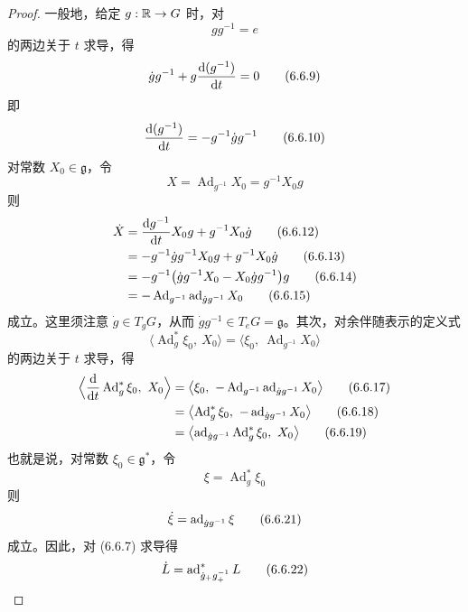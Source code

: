 \begin{proof}
  一般地，给定 $g:\mathbb{R}\to G$ 时，对
  \begin{equation}
    gg^{-1} = e
    \tag{6.6.8}
  \end{equation}
  的两边关于 $t$ 求导，得
  \begin{equation}
    \dot{g}g^{-1} + g\frac{\mathrm{d}(g^{-1})}{\mathrm{d} t} = 0
    \tag{6.6.9}
  \end{equation}
  即
  \begin{equation}
    \frac{\mathrm{d}(g^{-1})}{\mathrm{d} t} = -g^{-1}\dot{g}g^{-1}
    \tag{6.6.10}
  \end{equation}
  对常数 $X_0\in\mathfrak{g}$，令
  \begin{equation}
    X = \operatorname{Ad}_{g^{-1}}X_0 = g^{-1}X_0g
    \tag{6.6.11}
  \end{equation}
  则
  \begin{align}
    \dot{X} &= \frac{\mathrm{d} g^{-1}}{\mathrm{d} t}X_0g + g^{-1}X_0\dot{g} \tag{6.6.12}\\
    &= -g^{-1}\dot{g}g^{-1}X_0g + g^{-1}X_0\dot{g} \tag{6.6.13}\\
    &= -g^{-1}\bigl(\dot{g}g^{-1}X_0 - X_0\dot{g}g^{-1}\bigr)g \tag{6.6.14}\\
    &= -\operatorname{Ad}_{g^{-1}}\operatorname{ad}_{\dot{g}g^{-1}}X_0 \tag{6.6.15}
  \end{align}
  成立。这里须注意 $\dot{g}\in T_gG$，从而 $\dot{g}g^{-1}\in T_eG=\mathfrak{g}$。其次，对余伴随表示的定义式
  \begin{equation}
    \bigl\langle \operatorname{Ad}^*_g\xi_0,\ X_0\bigr\rangle
    = \bigl\langle \xi_0,\ \operatorname{Ad}_{g^{-1}}X_0\bigr\rangle
    \tag{6.6.16}
  \end{equation}
  的两边关于 $t$ 求导，得
  \begin{align}
    \Bigl\langle \frac{\rd}{\rd t}\operatorname{Ad}^*_g\xi_0,\ X_0\Bigr\rangle
      &= \bigl\langle \xi_0,\ -\operatorname{Ad}_{g^{-1}}\ad_{\dot{g}g^{-1}}X_0\bigr\rangle \tag{6.6.17}\\
    &= \bigl\langle \operatorname{Ad}^*_g\xi_0,\ -\ad_{\dot{g}g^{-1}}X_0\bigr\rangle \tag{6.6.18}\\
    &= \bigl\langle \ad_{\dot{g}g^{-1}}\operatorname{Ad}^*_g\xi_0,\ X_0\bigr\rangle \tag{6.6.19}
  \end{align}
  也就是说，对常数 $\xi_0\in\mathfrak{g}^*$，令
  \begin{equation}
    \xi = \operatorname{Ad}^*_g\xi_0
    \tag{6.6.20}
  \end{equation}
  则
  \begin{equation}
    \dot{\xi} = \operatorname{ad}_{\dot{g}g^{-1}}\xi
    \tag{6.6.21}
  \end{equation}
  成立。因此，对 (6.6.7) 求导得
  \begin{equation}
    \dot{L} = \operatorname{ad}^*_{\dot{g}_+g_+^{-1}}L
    \tag{6.6.22}
  \end{equation}


\end{proof}
